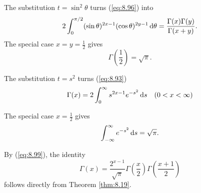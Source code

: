 \begin{thm}
    \label{thm:8.21}
    The substitution $t = \sin^2 \theta$ turns (\ref{eq:8.96}) into
    \begin{equation}
        \label{eq:8.98}
        2 \int_{0}^{\pi/2}
        (\sin \theta)^{2x-1}
        (\cos \theta)^{2y-1}
        \d \theta =
        \frac{\Gamma(x)\Gamma(y)}{\Gamma(x+y)}.
    \end{equation}
    The special case $x=y=\frac{1}{2}$ gives
    \begin{equation}
        \label{eq:8.99}
        \Gamma\left( \frac{1}{2} \right) = \sqrt{\pi} .
    \end{equation}

    The substitution $t=s^2$ turns (\ref{eq:8.93})
    \begin{equation}
        \label{eq:8.100}
        \Gamma(x) = 2 \int_{0}^{\infty} s^{2x-1} e^{-s^2} \d s
        \quad
        (0 < x < \infty)
    \end{equation}

    The special case $x=\frac{1}{2}$ gives
    \begin{equation}
        \label{eq:8.101}
        \int_{-\infty}^{\infty} e^{-s^2} \d s = \sqrt{\pi} .
    \end{equation}

    By (\ref{eq:8.99}), the identity
    \begin{equation}
        \label{eq:8.102}
        \Gamma(x) = \frac{2^{x-1}}{\sqrt{\pi}}
        \Gamma \left( \frac{x}{2} \right)
        \Gamma \left( \frac{x+1}{2} \right)
    \end{equation}
    follows directly from Theorem \ref{thm:8.19}.
\end{thm}

